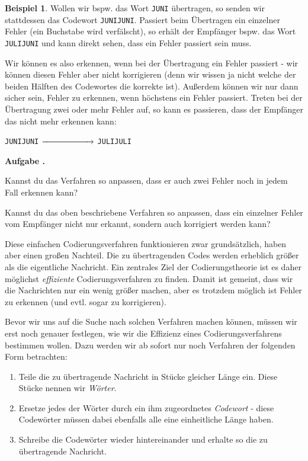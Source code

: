 \documentclass[a4paper,ngerman,12pt]{scrartcl}
\newcommand{\red}[1]{{\color{red}#1}}
\theoremstyle{definition}
\newtheorem{bsp}[defn]{Beispiel}
\theoremstyle{plain}
\theoremstyle{remark}
\newlength{\aufgabenskip}
\newcounter{aufgabennummer}
\newenvironment{aufgabe}[1]{
	\addtocounter{aufgabennummer}{1}
	\textbf{Aufgabe \theaufgabennummer.} \emph{#1} \par
}{\vspace{\aufgabenskip}}
\begin{document}
\begin{bsp}	
	Wollen wir bspw. das Wort \texttt{JUNI} übertragen, so senden wir stattdessen das Codewort \texttt{JUNIJUNI}. Passiert beim Übertragen ein einzelner Fehler (ein Buchstabe wird verfälscht), so erhält der Empfänger bspw. das Wort \texttt{JU\red{L}IJUNI} und kann direkt sehen, dass ein Fehler passiert sein muss.
\end{bsp}

Wir können es also erkennen, wenn bei der Übertragung ein Fehler passiert - wir können diesen Fehler aber nicht korrigieren (denn wir wissen ja nicht welche der beiden Hälften des Codewortes die korrekte ist). Außerdem können wir nur dann sicher sein, Fehler zu erkennen, wenn höchstens ein Fehler passiert. Treten bei der Übertragung zwei oder mehr Fehler auf, so kann es passieren, dass der Empfänger das nicht mehr erkennen kann:
	\begin{center}
		\texttt{JUNIJUNI} $\xrightarrow{\hspace*{2cm}}$ \texttt{JU\red{L}IJU\red{L}I}
	\end{center}

\begin{aufgabe}{}\label{aufgabe:verdreifachungsCodierung}
	Kannst du das Verfahren so anpassen, dass er auch zwei Fehler noch in jedem Fall erkennen kann?
	
	Kannst du das oben beschriebene Verfahren so anpassen, dass ein einzelner Fehler vom Empfänger nicht nur erkannt, sondern auch korrigiert werden kann?
\end{aufgabe}

Diese einfachen Codierungsverfahren funktionieren zwar grundsätzlich, haben aber einen großen Nachteil. Die zu übertragenden Codes werden erheblich größer als die eigentliche Nachricht. Ein zentrales Ziel der Codierungstheorie ist es daher möglichst \emph{effiziente} Codierungsverfahren zu finden. Damit ist gemeint, dass wir die Nachrichten nur ein wenig größer machen, aber es trotzdem möglich ist Fehler zu erkennen (und evtl. sogar zu korrigieren).

Bevor wir uns auf die Suche nach solchen Verfahren machen können, müssen wir erst noch genauer festlegen, wie wir die Effizienz eines Codierungsverfahrens bestimmen wollen. Dazu werden wir ab sofort nur noch Verfahren der folgenden Form betrachten: 
\begin{enumerate}
	\item Teile die zu übertragende Nachricht in Stücke gleicher Länge ein. Diese Stücke nennen wir \emph{Wörter}. 
	\item Ersetze jedes der Wörter durch ein ihm zugeordnetes \emph{Codewort} - diese Codewörter müssen dabei ebenfalls alle eine einheitliche Länge haben.
	\item Schreibe die Codewörter wieder hintereinander und erhalte so die zu übertragende Nachricht.
\end{enumerate}
\end{document}

